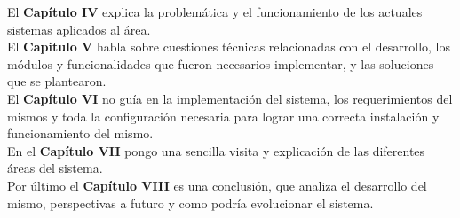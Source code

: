 El \textbf{Capítulo IV} explica la problemática y el funcionamiento de los actuales sistemas aplicados al área. \\[0.1cm]

El \textbf{Capitulo V} habla sobre cuestiones técnicas relacionadas con el desarrollo, los módulos y funcionalidades que fueron necesarios implementar, y las soluciones que se plantearon. \\[0.1cm]

El \textbf{Capítulo VI} no guía en la implementación del sistema, los requerimientos del mismos y toda la configuración necesaria para lograr una correcta instalación y funcionamiento del mismo.\\[0.1cm]

En el \textbf{Capítulo VII} pongo una sencilla visita y explicación de las diferentes áreas del sistema. \\[0.1cm]

Por último el \textbf{Capítulo VIII} es una conclusión, que analiza el desarrollo del mismo, perspectivas a futuro y como podría evolucionar el sistema.

